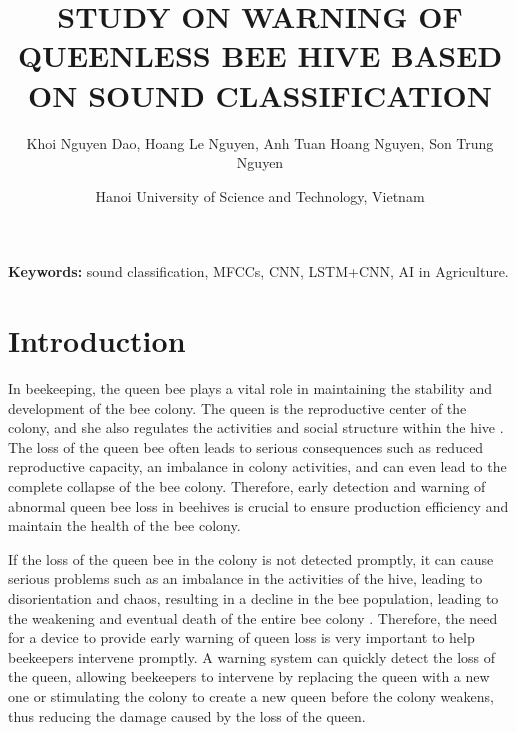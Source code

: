 \documentclass[twocolumn]{article}
\title{STUDY ON WARNING OF QUEENLESS \break BEE HIVE BASED ON SOUND CLASSIFICATION}
\author{\normalsize Khoi Nguyen Dao, Hoang Le Nguyen, Anh Tuan Hoang Nguyen, Son Trung Nguyen}
\date{\normalsize Hanoi University of Science and Technology, Vietnam}
\begin{document}
\maketitle


\vspace{1em}
\noindent\textbf{Keywords:} sound classification, MFCCs, CNN, LSTM+CNN, AI in Agriculture.

\section{Introduction}
In beekeeping, the queen bee plays a vital role in maintaining the stability and development
of the bee colony. The queen is the reproductive center of the colony, and she also regulates
the activities and social structure within the hive \cite{anton2022introduction}. The loss of the queen bee
often leads to serious consequences such as reduced reproductive capacity, an imbalance in
colony activities, and can even lead to the complete collapse of the bee colony. Therefore,
early detection and warning of abnormal queen bee loss in beehives is crucial to ensure
production efficiency and maintain the health of the bee colony.

If the loss of the queen bee in the colony is not detected promptly, it can cause serious
problems such as an imbalance in the activities of the hive, leading to disorientation and
chaos, resulting in a decline in the bee population, leading to the weakening and eventual
death of the entire bee colony \cite{honey_bee_colony_2021}. Therefore, the need for a device to provide early
warning of queen loss is very important to help beekeepers intervene promptly. A warning
system can quickly detect the loss of the queen, allowing beekeepers to intervene by
replacing the queen with a new one or stimulating the colony to create a new queen before
the colony weakens, thus reducing the damage caused by the loss of the queen.
\end{document}
